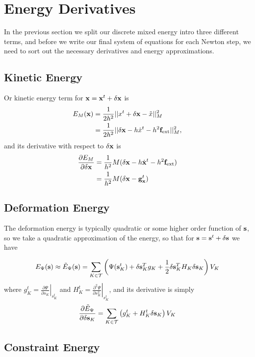 
\section{Energy Derivatives}

In the previous section we split our discrete mixed energy intro three different terms, and before we write our final system of equations for each Newton step, we need to sort out the necessary derivatives and energy approximations.

\subsection{Kinetic Energy}
Or kinetic energy term for $\mathbf{x} = \mathbf{x}^t + \delta \mathbf{x}$ is
\begin{align}
E_M (\mathbf{x}) &= \frac{1}{2h^2} ||x^t + \delta \mathbf{x} - \tilde{x}||_M^2 \\
	&= \frac{1}{2h^2} ||\delta \mathbf{x} - h\dot{x}^t - h^2 \mathbf{f}_\text{ext} ||_M^2,
\end{align}
and its derivative with respect to $\delta \mathbf{x}$ is
\begin{equation}
\begin{split}
\frac{\partial E_M }{\partial \delta \mathbf{x}} &= \frac{1}{h^2}M(\delta \mathbf{x} - h\dot{\mathbf{x}}^t - h^2 \mathbf{f}_\text{ext}) \\
&=  \frac{1}{h^2}M(\delta \mathbf{x} -{\mathbf{g}_{\mathbf{x}}^t}) 
\end{split}
\end{equation}

\subsection{Deformation Energy}
The deformation energy is typically quadratic or some higher order function of $\mathbf{s}$, so we take a quadratic approximation of the energy, so that for $\mathbf{s}=\mathbf{s}^t + \delta \mathbf{s}$ we have

\begin{equation}
E_\Psi (\mathbf{s}) \approx \tilde{E}_\Psi (\mathbf{s}) = \sum_{K \in \mathcal{T}} \left(\Psi(\mathbf{s}_K^t) + \delta \mathbf{s}_K^T g_K + \frac{1}{2}\delta \mathbf{s}_K^T H_K \delta \mathbf{s}_K \right) V_K
\end{equation}
where 
$g_K^t=\left.\frac{\partial \Psi}{\partial s_K}\right|_{s_K^t}$ and
$H_K^t=\left.\frac{\partial^2 \Psi}{\partial s_K^2}\right|_{s_K^t}$, and its derivative is simply
\begin{equation}
\frac{\partial \tilde{E}_\Psi}{\partial \delta \mathbf{s}_K} =
\sum_{K \in \mathcal{T}} \left(g_K^t + H_K^t \delta \mathbf{s}_K \right) V_K
\end{equation}


\subsection{Constraint Energy}

